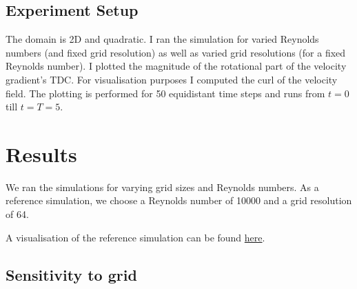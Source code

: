 \documentclass[a4paper,12pt]{article}
\begin{document}
\subsection{Experiment Setup}
The domain is 2D and quadratic. 
I ran the simulation for varied Reynolds numbers (and fixed grid resolution) as well as varied grid resolutions (for a fixed Reynolds number).
I plotted the magnitude of the rotational part of the velocity gradient's \ac{TDC}.
For visualisation purposes I computed the curl of the velocity field.
The plotting is performed for 50 equidistant time steps and runs from $t=0$ till $t=T=5$.

\newpage
\section{Results}
We ran the simulations for varying grid sizes and Reynolds numbers.
As a reference simulation, we choose a Reynolds number of 10000 and a grid resolution of 64.

A visualisation of the reference simulation can be found \href{https://github.com/paulmyr/DD2365-AdvancedCFD/blob/master/project/presentation/vid/velocity_lic_64.avi}{here}.

\subsection{Sensitivity to grid}
\label{sec:result_grid}
\end{document}
